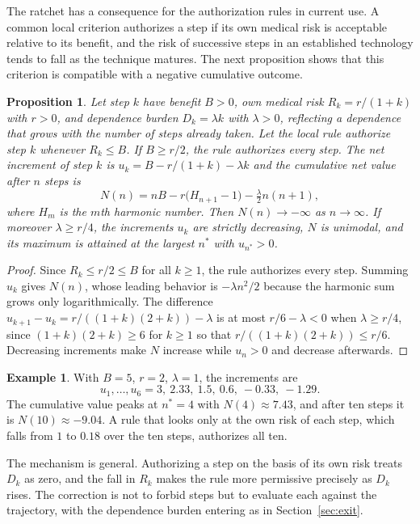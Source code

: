 \documentclass[11pt]{article}
\theoremstyle{plain}
\newtheorem{proposition}{Proposition}
\theoremstyle{definition}
\newtheorem{example}{Example}
\theoremstyle{remark}
\begin{document}
The ratchet has a consequence for the authorization rules in current use. A common local criterion authorizes a step if its own medical risk is acceptable relative to its benefit, and the risk of successive steps in an established technology tends to fall as the technique matures. The next proposition shows that this criterion is compatible with a negative cumulative outcome.

\begin{proposition}\label{prop:greedy}
Let step $k$ have benefit $B>0$, own medical risk $R_k=r/(1+k)$ with $r>0$, and dependence burden $D_k=\lambda k$ with $\lambda>0$, reflecting a dependence that grows with the number of steps already taken. Let the local rule authorize step $k$ whenever $R_k\le B$. If $B\ge r/2$, the rule authorizes every step. The net increment of step $k$ is $u_k=B-r/(1+k)-\lambda k$ and the cumulative net value after $n$ steps is
\[
N(n)=nB-r\big(H_{n+1}-1\big)-\tfrac{\lambda}{2}n(n+1),
\]
where $H_m$ is the $m$th harmonic number. Then $N(n)\to-\infty$ as $n\to\infty$. If moreover $\lambda\ge r/4$, the increments $u_k$ are strictly decreasing, $N$ is unimodal, and its maximum is attained at the largest $n^\ast$ with $u_{n^\ast}>0$.
\end{proposition}

\begin{proof}
Since $R_k\le r/2\le B$ for all $k\ge1$, the rule authorizes every step. Summing $u_k$ gives $N(n)$, whose leading behavior is $-\lambda n^2/2$ because the harmonic sum grows only logarithmically. The difference $u_{k+1}-u_k=r/((1+k)(2+k))-\lambda$ is at most $r/6-\lambda<0$ when $\lambda\ge r/4$, since $(1+k)(2+k)\ge6$ for $k\ge1$ so that $r/((1+k)(2+k))\le r/6$. Decreasing increments make $N$ increase while $u_n>0$ and decrease afterwards.
\end{proof}

\begin{example}
With $B=5$, $r=2$, $\lambda=1$, the increments are
\[
u_1,\dots,u_6=3,\ 2.33,\ 1.5,\ 0.6,\ -0.33,\ -1.29.
\]
\noindent The cumulative value peaks at $n^\ast=4$ with $N(4)\approx7.43$, and after ten steps it is $N(10)\approx-9.04$. A rule that looks only at the own risk of each step, which falls from $1$ to $0.18$ over the ten steps, authorizes all ten.
\end{example}

The mechanism is general. Authorizing a step on the basis of its own risk treats $D_k$ as zero, and the fall in $R_k$ makes the rule more permissive precisely as $D_k$ rises. The correction is not to forbid steps but to evaluate each against the trajectory, with the dependence burden entering as in Section~\ref{sec:exit}.
\end{document}
